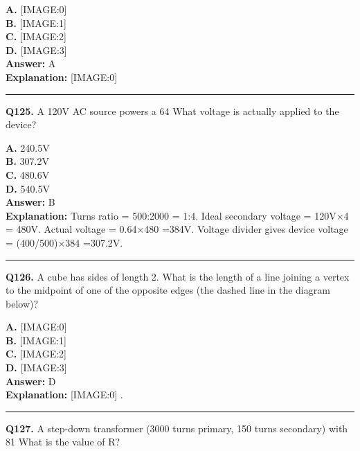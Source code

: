 \documentclass[12pt]{article}
\begin{document}
\textbf{A.} [IMAGE:0] \\
\textbf{B.} [IMAGE:1] \\
\textbf{C.} [IMAGE:2] \\
\textbf{D.} [IMAGE:3] \\

\textbf{Answer:} A \\
\textbf{Explanation:} [IMAGE:0]

\hrule
\vspace{1em}


\noindent
\textbf{Q125.} A 120V AC source powers a 64%
What voltage is actually applied to the device?



\textbf{A.} 240.5V \\
\textbf{B.} 307.2V \\
\textbf{C.} 480.6V \\
\textbf{D.} 540.5V \\

\textbf{Answer:} B \\
\textbf{Explanation:} Turns ratio = 500:2000 = 1:4. Ideal secondary voltage = 120V×4 = 480V. Actual voltage = \sqrt{}0.64×480 =384V. Voltage divider gives device voltage = (400/500)×384 =307.2V.

\hrule
\vspace{1em}


\noindent
\textbf{Q126.} A cube has sides of length 2. What is the length of a line joining a vertex to the midpoint of one of the opposite edges (the dashed line in the diagram below)?



\textbf{A.} [IMAGE:0] \\
\textbf{B.} [IMAGE:1] \\
\textbf{C.} [IMAGE:2] \\
\textbf{D.} [IMAGE:3] \\

\textbf{Answer:} D \\
\textbf{Explanation:} [IMAGE:0]
.

\hrule
\vspace{1em}


\noindent
\textbf{Q127.} A step-down transformer (3000 turns primary, 150 turns secondary) with 81%
What is the value of R?
\end{document}

